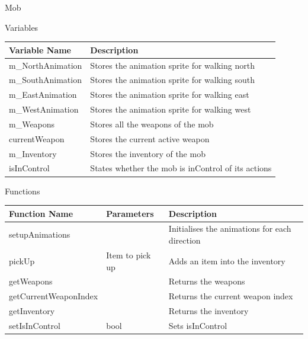 \documentclass{article}
\begin{document}
                Mob
                \begin{center}
                    Variables
                    \begin{tabular}{ | m{} | m{} | }
                        \hline
                        \textbf{Variable Name} & \textbf{Description} \\
                        \hline
                        m\_NorthAnimation & Stores the animation sprite for walking north \\
                        \hline
                        m\_SouthAnimation & Stores the animation sprite for walking south \\
                        \hline
                        m\_EastAnimation & Stores the animation sprite for walking east \\
                        \hline
                        m\_WestAnimation & Stores the animation sprite for walking west \\
                        \hline
                        m\_Weapons & Stores all the weapons of the mob \\
                        \hline
                        currentWeapon & Stores the current active weapon \\
                        \hline
                        m\_Inventory & Stores the inventory of the mob \\
                        \hline
                        isInControl & States whether the mob is inControl of its actions \\
                        \hline
                    \end{tabular}
                    Functions
                    \begin{tabular}{ | m{} | m{}| m{} | }
                        \hline
                        \textbf{Function Name} & \textbf{Parameters} & \textbf{Description} \\
                        \hline
                        setupAnimations & & Initialises the animations for each direction \\
                        \hline
                        pickUp & Item to pick up & Adds an item into the inventory \\
                        \hline
                        getWeapons & & Returns the weapons \\
                        \hline
                        getCurrentWeaponIndex & & Returns the current weapon index \\
                        \hline
                        getInventory & & Returns the inventory \\
                        \hline
                        setIsInControl & bool & Sets isInControl \\
                        \hline
                    \end{tabular}
                \end{center}
\end{document}
